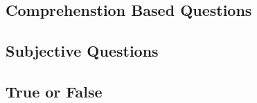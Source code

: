 \subsection*{Comprehenstion Based Questions}
\begin{enumerate}[label=\thesubsection.\arabic*,ref=\thesubsection.\theenumi]




\end{enumerate}
\subsection*{Subjective Questions}
\begin{enumerate}[label=\thesubsection.\arabic*,ref=\thesubsection.\theenumi]





\end{enumerate}
\subsection*{True or False}
\begin{enumerate}[label=\thesubsection.\arabic*,ref=\thesubsection.\theenumi]




\end{enumerate}
